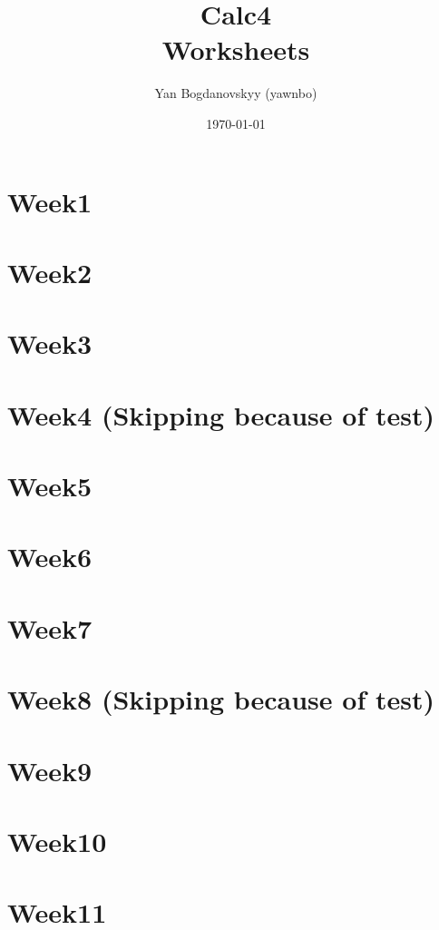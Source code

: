 \documentclass{report}
\title{\Huge{Calc4}\\ Worksheets}
\author{\huge{Yan Bogdanovskyy (yawnbo)}}
\date{\today}
\begin{document}
\maketitle
\tableofcontents
\pagebreak

\begin{multicols}{2}
\chapter{Week1}


\chapter{Week2}


\chapter{Week3}


\chapter{Week4 (Skipping because of test) }
\chapter{Week5}


\chapter{Week6}


\chapter{Week7}


\chapter{Week8 (Skipping because of test)}

\chapter{Week9}


\chapter{Week10}


\chapter{Week11}

\end{multicols}
\end{document}
